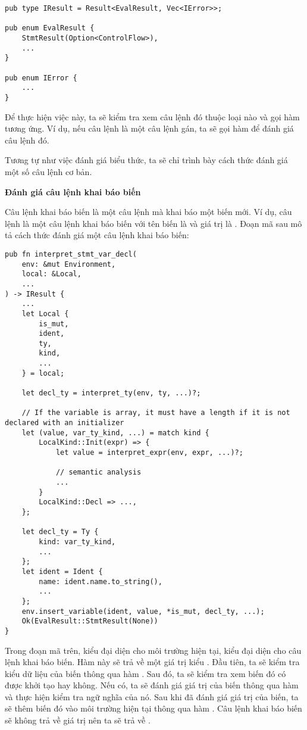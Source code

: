 \begin{lstlisting}[]
pub type IResult = Result<EvalResult, Vec<IError>>;

pub enum EvalResult {
    StmtResult(Option<ControlFlow>),
    ...
}

pub enum IError {
    ...
}
\end{lstlisting}

    Để thực hiện việc này, ta sẽ kiểm tra xem câu lệnh đó thuộc loại nào và gọi hàm tương ứng. Ví dụ, nếu câu lệnh là một câu lệnh gán, ta sẽ gọi hàm  để đánh giá câu lệnh đó.

    Tương tự như việc đánh giá biểu thức, ta sẽ chỉ trình bày cách thức đánh giá một số câu lệnh cơ bản.

\noindent \textbf{Đánh giá câu lệnh khai báo biến}

    Câu lệnh khai báo biến là một câu lệnh mà khai báo một biến mới. Ví dụ, câu lệnh  là một câu lệnh khai báo biến với tên biến là  và giá trị là . Đoạn mã sau mô tả cách thức đánh giá một câu lệnh khai báo biến:

\begin{lstlisting}[]
pub fn interpret_stmt_var_decl(
    env: &mut Environment,
    local: &Local,
    ...
) -> IResult {
    ...
    let Local {
        is_mut,
        ident,
        ty,
        kind,
        ...
    } = local;

    let decl_ty = interpret_ty(env, ty, ...)?;

    // If the variable is array, it must have a length if it is not declared with an initializer
    let (value, var_ty_kind, ...) = match kind {
        LocalKind::Init(expr) => {
            let value = interpret_expr(env, expr, ...)?;

            // semantic analysis
            ...
        }
        LocalKind::Decl => ...,
    };

    let decl_ty = Ty {
        kind: var_ty_kind,
        ...
    };
    let ident = Ident {
        name: ident.name.to_string(),
        ...
    };
    env.insert_variable(ident, value, *is_mut, decl_ty, ...);
    Ok(EvalResult::StmtResult(None))
}
\end{lstlisting}

    Trong đoạn mã trên,  kiểu  đại diện cho môi trường hiện tại,  kiểu  đại diện cho câu lệnh khai báo biến. Hàm này sẽ trả về một giá trị kiểu . Đầu tiên, ta sẽ kiểm tra kiểu dữ liệu của biến thông qua hàm . Sau đó, ta sẽ kiểm tra xem biến đó có được khởi tạo hay không. Nếu có, ta sẽ đánh giá giá trị của biến thông qua hàm  và thực hiện kiểm tra ngữ nghĩa của nó. Sau khi đã đánh giá giá trị của biến, ta sẽ thêm biến đó vào môi trường hiện tại thông qua hàm . Câu lệnh khai báo biến sẽ không trả về giá trị nên ta sẽ trả về .

